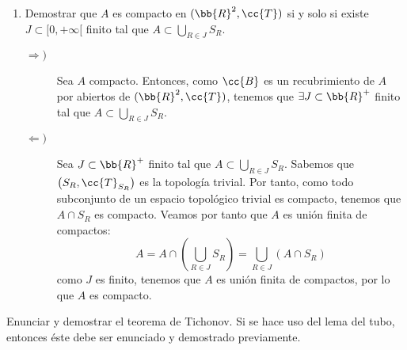 \documentclass[12pt]{article}
\newcommand{\T}[0]{\cc{T}}
\begin{document}
\begin{ejercicio}[4.5 puntos]
\begin{enumerate}
            \item Demostrar que $A$ es compacto en $(\bb{R}^2,\T)$ si y solo si existe $J\subset [0,+\infty[$ finito tal que
            $A\subset \bigcup\limits_{R\in J}S_R$.

            \begin{description}
                \item[$\Longrightarrow)$] Sea $A$ compacto. Entonces, como $\cc{B}$ es un recubrimiento de $A$ por abiertos de $(\bb{R}^2,\T)$,
                tenemos que $\exists J\subset \bb{R}^+$ finito tal que $A\subset \bigcup\limits_{R\in J}S_R$.

                \item[$\Longleftarrow)$] Sea $J\subset \bb{R}^+$ finito tal que $A\subset \bigcup\limits_{R\in J}S_R$. Sabemos que $\left(S_R, \T_{S_R}\right)$ es la
                topología trivial. Por tanto, como todo subconjunto de un espacio topológico trivial es compacto, tenemos que $A\cap S_R$ es compacto. Veamos por tanto que
                $A$ es unión finita de compactos:
                \begin{equation*}
                    A = A \cap \left(\bigcup\limits_{R\in J}S_R\right) = \bigcup\limits_{R\in J} \left(A\cap S_R\right)
                \end{equation*}
                como $J$ es finito, tenemos que $A$ es unión finita de compactos, por lo que $A$ es compacto.
            \end{description}
        \end{enumerate}
    \end{ejercicio}


    \begin{ejercicio}[2.5 puntos] Enunciar y demostrar el teorema de Tichonov. Si se hace uso del lema del tubo,
        entonces éste debe ser enunciado y demostrado previamente.        
    \end{ejercicio}
\end{document}
